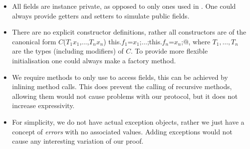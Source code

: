\begin{itemize}
\item All fields are instance private, as opposed to only \Q@capsule@ ones used in \Q@invariant@. One could always provide getters and setters to simulate public fields.
\item There are no explicit constructor definitions, rather all constructors are of the canonical form
\Q@$C$($T_1 x_1$,$\ldots$,$T_n x_n$) {this.$f_1$=$x_1$;$\ldots$;this.$f_n$=$x_n$;}@,
 where $T_1, \ldots, T_n$ are the types (including modifiers) of $C$.
To provide more flexible initialisation one could always make a factory method.
\item We require \Q@invariant@ methods to only use \Q@this@ to access fields,
this can be achieved by inlining method calls.
This does prevent the calling of recursive methods,
allowing them would not cause problems with our protocol,
but it does not increase expressivity.
\item For simplicity, we do not have actual exception objects,
rather we just have a concept of \emph{errors} with no associated values.
Adding \Q@imm@ exceptions would not cause any interesting variation of our proof.
\end{itemize}


